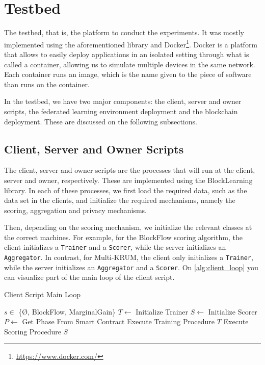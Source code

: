 \section{Testbed}

The testbed, that is, the platform to conduct the experiments. It was mostly implemented using the aforementioned library and Docker\footnote{\url{https://www.docker.com/}}. Docker is a platform that allows to easily deploy applications in an isolated setting through what is called a container, allowing us to simulate multiple devices in the same network. Each container runs an image, which is the name given to the piece of software than runs on the container.

In the testbed, we have two major components: the client, server and owner scripts, the federated learning environment deployment and the blockchain deployment. These are discussed on the following subsections.

\subsection{Client, Server and Owner Scripts}

The client, server and owner scripts are the processes that will run at the client, server and owner, respectively. These are implemented using the BlockLearning library. In each of these processes, we first load the required data, such as the data set in the clients, and initialize the required mechanisms, namely the scoring, aggregation and privacy mechanisms.

Then, depending on the scoring mechanism, we initialize the relevant classes at the correct machines. For example, for the BlockFlow scoring algorithm, the client initializes a \texttt{Trainer} and a \texttt{Scorer}, while the server initializes an \texttt{Aggregator}. In contrast, for Multi-KRUM, the client only initializes a \texttt{Trainer}, while the server initializes an \texttt{Aggregator} and a \texttt{Scorer}. On \autoref{alg:client_loop} you can visualize part of the main loop of the  client script.

\begin{algorithm}
\caption{Client Script Main Loop}\label{alg:client_loop}
\begin{algorithmic}
\Require $s \in$ \{\O, BlockFlow, MarginalGain\}
\State $T \gets $ Initialize Trainer
    \State $S \gets $ Initialize Scorer
\EndIf
{}
    \State $P \gets$ Get Phase From Smart Contract
        \State Execute Training Procedure $T$
        \State Execute Scoring Procedure $S$
    \EndIf
\EndWhile
\end{algorithmic}
\end{algorithm}

